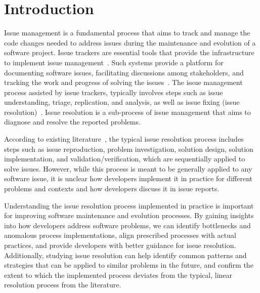 
\section{Introduction}
\label{sec:intro}




Issue management is a fundamental process that aims to track and manage the code changes needed to address issues during the maintenance and evolution of a software project. Issue trackers are essential tools that provide the infrastructure to implement issue management~\cite{Zimmermann2009}. Such systems provide a platform for documenting software issues, facilitating discussions among stakeholders, and tracking the work and progress of solving the issues~\cite{Zimmermann2009,Zimmermann2010}. The issue management process assisted by issue trackers, typically involves steps such as issue understanding, triage, replication, and analysis, as well as issue fixing (\aka issue resolution)~\cite{Zimmermann2010,firefox-bug-handling}. 
Issue resolution is a sub-process of issue management that aims to diagnose and resolve the reported problems. 

According to existing literature~\cite{zhang2016literature,saha2015understanding,zeller2009programs,rajlich2011software,eren2023analyzing}, the typical issue resolution process includes steps such as issue reproduction, problem investigation, solution design, solution implementation, and validation/verification, which are sequentially applied to solve issues. However, while this process is meant to be generally applied to any software issue, it is unclear how developers implement it in practice for different problems and contexts and how developers discuss it in issue reports.


Understanding the issue resolution process implemented in practice is important for improving software maintenance and evolution processes. By gaining insights into how developers address software problems, we can identify bottlenecks and anomalous process implementations,  align prescribed processes with actual practices, and provide developers with better guidance for issue resolution.  Additionally, studying issue resolution can help identify common patterns and strategies that can be applied to similar problems in the future, and confirm the extent to which the implemented process deviates from the typical, linear resolution process from the literature.


